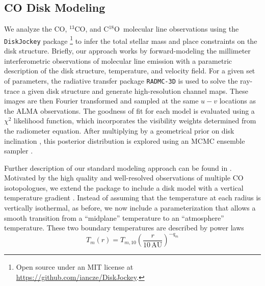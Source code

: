 \documentclass{aastex6}
\newcommand{\twelve}{CO}
\newcommand{\thirteen}{${}^{13}$CO}
\newcommand{\eighteen}{C${}^{18}$O}
\begin{document}
\subsection{CO Disk Modeling}

We analyze the \twelve, \thirteen, and \eighteen\ molecular line observations using the \texttt{DiskJockey} package \citep{czekala15a}\footnote{Open source under an MIT license at \url{https://github.com/iancze/DiskJockey}.} to infer the total stellar mass and place constraints on the disk structure. Briefly, our approach works by forward-modeling the millimeter interferometric observations of molecular line emission with a parametric description of the disk structure, temperature, and velocity field. For a given set of parameters, the radiative transfer package \texttt{RADMC-3D} \citep{dullemond12} is used to solve the ray-trace a given disk structure and generate high-resolution channel maps. These images are then Fourier transformed and sampled at the same $u-v$ locations as the ALMA observations. The goodness of fit for each model is evaluated using a $\chi^2$ likelihood function, which incorporates the visibility weights determined from the radiometer equation. After multiplying by a geometrical prior on disk inclination \citep{czekala16}, this posterior distribution is explored using an MCMC ensemble sampler \citep{goodman10,foreman-mackey13}.

Further description of our standard modeling approach can be found in \citep{czekala15a,czekala16}. Motivated by the high quality and well-resolved observations of multiple CO isotopologues, we extend the package to include a disk model with a vertical temperature gradient \citep[e.g.,][]{dartois03}. Instead of assuming that the temperature at each radius is vertically isothermal, as before, we now include a parameterization \citep[following][]{rosenfeld13a,williams14} that allows a smooth transition from a ``midplane'' temperature to an ``atmosphere'' temperature. These two boundary temperatures are described by power laws
\begin{equation}
	T_m(r) = T_{m,10} \left ( \frac{r}{10\,\textrm{AU}} \right )^{-q_m}
\end{equation}
\end{document}
